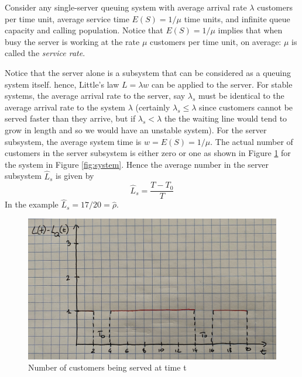 \documentclass[
]{book}
\begin{document}
Consider any single-server queuing system with average arrival rate \(\lambda\) customers per time unit, average service time \(E(S)=1/\mu\) time units, and infinite queue capacity and calling population. Notice that \(E(S)=1/\mu\) implies that when busy the server is working at the rate \(\mu\) customers per time unit, on average: \(\mu\) is called the \emph{service rate}.

Notice that the server alone is a subsystem that can be considered as a queuing system itself. hence, Little's law \(L=\lambda w\) can be applied to the server. For stable systems, the average arrival rate to the server, say \(\lambda_s\) must be identical to the average arrival rate to the system \(\lambda\) (certainly \(\lambda_s\leq \lambda\) since customers cannot be served faster than they arrive, but if \(\lambda_s<\lambda\) the the waiting line would tend to grow in length and so we would have an unstable system). For the server subsystem, the average system time is \(w=E(S)=1/\mu\). The actual number of customers in the server subsystem is either zero or one as shown in Figure \ref{fig:system3} for the system in Figure \ref{fig:system}. Hence the average number in the server subsystem \(\hat{L}_s\) is given by
\[
\hat{L}_s = \frac{T-T_0}{T}
\]
In the example \(\hat{L}_s=17/20=\hat{\rho}\).

\begin{figure}

{\centering \includegraphics[width=0.9\linewidth]{images/system3} 

}

\caption{Number of customers being served at time t}\label{fig:system3}
\end{figure}
\end{document}
